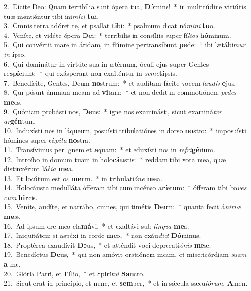 {2.~}Dícite Deo: Quam terribília sunt ópera tua, \textbf{Dó}mine!~* in multitúdine virtútis tuæ mentiéntur tibi ini\textit{mí}\textit{ci} \textbf{tu}i.\\
{3.~}Omnis terra adóret te, et psallat \textbf{ti}bi:~* psalmum dicat nó\textit{mi}\textit{ni} \textbf{tu}o.\\
{4.~}Veníte, et vidéte ópera \textbf{De}i:~* terríbilis in consíliis super fí\textit{li}\textit{os} \textbf{hó}minum.\\
{5.~}Qui convértit mare in áridam, in flúmine pertransíbunt \textbf{pe}de:~* ibi lætábi\textit{mur} \textit{in} \textbf{i}pso.\\
{6.~}Qui dominátur in virtúte sua in ætérnum, óculi ejus super Gentes re\textbf{spí}ciunt:~* qui exásperant non exalténtur in \textit{se}\textit{me}\textbf{tí}psis.\\
{7.~}Benedícite, Gentes, Deum \textbf{no}strum:~* et audítam fácite vocem \textit{lau}\textit{dis} \textbf{e}jus,\\
{8.~}Qui pósuit ánimam meam ad \textbf{vi}tam:~* et non dedit in commotiónem \textit{pe}\textit{des} \textbf{me}os.\\
{9.~}Quóniam probásti nos, \textbf{De}us:~* igne nos examinásti, sicut examiná\textit{tur} \textit{ar}\textbf{gén}tum.\\
{10.~}Induxísti nos in láqueum, posuísti tribulatiónes in dorso \textbf{no}stro:~* imposuísti hómines super cá\textit{pi}\textit{ta} \textbf{no}stra.\\
{11.~}Transívimus per ignem et \textbf{a}quam:~* et eduxísti nos in \textit{re}\textit{fri}\textbf{gé}rium.\\
{12.~}Introíbo in domum tuam in holo\textbf{cáu}stis:~* reddam tibi vota mea, quæ distinxérunt lá\textit{bi}\textit{a} \textbf{me}a.\\
{13.~}Et locútum est os \textbf{me}um,~* in tribulati\textit{ó}\textit{ne} \textbf{me}a.\\
{14.~}Holocáusta medulláta ófferam tibi cum incénso a\textbf{rí}etum:~* ófferam tibi bo\textit{ves} \textit{cum} \textbf{hir}cis.\\
{15.~}Veníte, audíte, et narrábo, omnes, qui timétis \textbf{De}um:~* quanta fecit á\textit{ni}\textit{mæ} \textbf{me}æ.\\
{16.~}Ad ipsum ore meo cla\textbf{má}vi,~* et exaltávi sub \textit{lin}\textit{gua} \textbf{me}a.\\
{17.~}Iniquitátem si aspéxi in corde \textbf{me}o,~* non exáu\textit{di}\textit{et} \textbf{Dó}minus.\\
{18.~}Proptérea exaudívit \textbf{De}us,~* et atténdit voci deprecati\textit{ó}\textit{nis} \textbf{me}æ.\\
{19.~}Benedíctus \textbf{De}us,~* qui non amóvit oratiónem meam, et misericórdiam \textit{su}\textit{am} \textbf{a} me.\\
{20.~}Glória Patri, et \textbf{Fí}lio,~* et Spirí\textit{tu}\textit{i} \textbf{San}cto.\\
{21.~}Sicut erat in princípio, et nunc, et \textbf{sem}per,~* et in sǽcula sæcu\textit{ló}\textit{rum}. \textbf{A}men.\\
